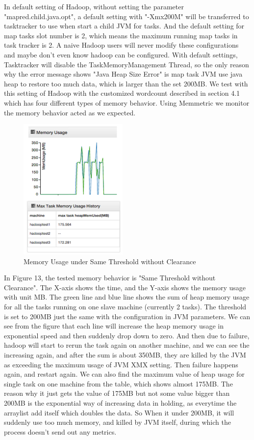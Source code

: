 In default setting of Hadoop, without setting the parameter "mapred.child.java.opt", a default setting with "-Xmx200M" will be transferred to tasktracker to use when start a child JVM for tasks. And the default setting for map tasks slot number is 2, which means the maximum running map tasks in task tracker is 2. A naive Hadoop users will never modify these configurations and maybe don't even know hadoop can be configured.
With default settings, Tasktracker will disable the TaskMemoryManagement Thread, so the only reason why the error message shows "Java Heap Size Error" is map task JVM use java heap to restore too much data, which is larger than the set 200MB.
We test with this setting of Hadoop with the customized wordcount described in section 4.1 which has four different types of memory behavior. Using Memmetric we monitor the memory behavior acted as we expected.

\begin{figure}[ht]
  \centering
    \includegraphics[width=2.1in]{image/test1a.png}
    \caption{Memory Usage under Same Threshold without Clearance}
    \label{ref:test1a}
\end{figure}

In Figure 13, the tested memory behavior is "Same Threshold without Clearance". The X-axis shows the time, and the Y-axis shows the memory usage with unit MB. The green line and blue line shows the sum of heap memory usage for all the tasks running on one slave machine (currently 2 tasks). The threshold is set to 200MB just the same with the configuration in JVM parameters. We can see from the figure that each line will increase the heap memory usage in exponential speed and then suddenly drop down to zero. And then due to failure, hadoop will start to rerun the task again on another machine, and we can see the increasing again, and after the sum is about 350MB, they are killed by the JVM as exceeding the maximum usage of JVM XMX setting. Then failure happens again, and restart again. We can also find the maximum value of heap usage for single task on one machine from the table, which shows almost 175MB. The reason why it just gets the value of 175MB but not some value bigger than 200MB is the exponential way of increasing data in holding, as everytime the arraylist add itself which doubles the data. So When it under 200MB, it will suddenly use too much memory, and killed by JVM itself, during which the process doesn't send out any metrics.

